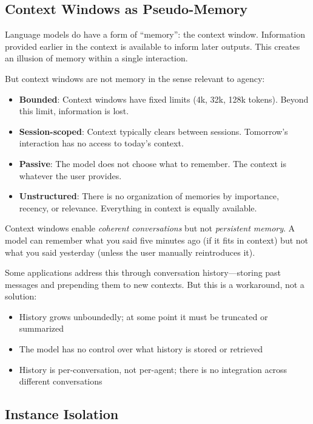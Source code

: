 \subsection{Context Windows as Pseudo-Memory}

Language models do have a form of ``memory'': the context window. Information provided earlier in the context is available to inform later outputs. This creates an illusion of memory within a single interaction.

But context windows are not memory in the sense relevant to agency:
\begin{itemize}
    \item \textbf{Bounded}: Context windows have fixed limits (4k, 32k, 128k tokens). Beyond this limit, information is lost.
    \item \textbf{Session-scoped}: Context typically clears between sessions. Tomorrow's interaction has no access to today's context.
    \item \textbf{Passive}: The model does not choose what to remember. The context is whatever the user provides.
    \item \textbf{Unstructured}: There is no organization of memories by importance, recency, or relevance. Everything in context is equally available.
\end{itemize}

Context windows enable \emph{coherent conversations} but not \emph{persistent memory}. A model can remember what you said five minutes ago (if it fits in context) but not what you said yesterday (unless the user manually reintroduces it).

Some applications address this through conversation history---storing past messages and prepending them to new contexts. But this is a workaround, not a solution:
\begin{itemize}
    \item History grows unboundedly; at some point it must be truncated or summarized
    \item The model has no control over what history is stored or retrieved
    \item History is per-conversation, not per-agent; there is no integration across different conversations
\end{itemize}

\subsection{Instance Isolation}

